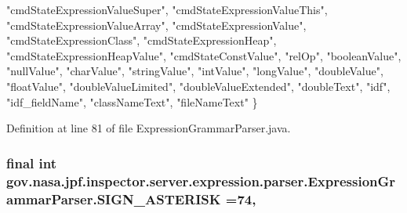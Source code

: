 \begin{DoxyCode}
    \textcolor{stringliteral}{"cmdStateExpressionValueSuper"}, \textcolor{stringliteral}{"cmdStateExpressionValueThis"}, \textcolor{stringliteral}{"cmdStateExpressionValueArray"}, 
    \textcolor{stringliteral}{"cmdStateExpressionValue"}, \textcolor{stringliteral}{"cmdStateExpressionClass"}, \textcolor{stringliteral}{"cmdStateExpressionHeap"}, 
    \textcolor{stringliteral}{"cmdStateExpressionHeapValue"}, \textcolor{stringliteral}{"cmdStateConstValue"}, \textcolor{stringliteral}{"relOp"}, \textcolor{stringliteral}{"booleanValue"}, 
    \textcolor{stringliteral}{"nullValue"}, \textcolor{stringliteral}{"charValue"}, \textcolor{stringliteral}{"stringValue"}, \textcolor{stringliteral}{"intValue"}, \textcolor{stringliteral}{"longValue"}, \textcolor{stringliteral}{"doubleValue"}, 
    \textcolor{stringliteral}{"floatValue"}, \textcolor{stringliteral}{"doubleValueLimited"}, \textcolor{stringliteral}{"doubleValueExtended"}, \textcolor{stringliteral}{"doubleText"}, 
    \textcolor{stringliteral}{"idf"}, \textcolor{stringliteral}{"idf\_fieldName"}, \textcolor{stringliteral}{"classNameText"}, \textcolor{stringliteral}{"fileNameText"}
  \}
\end{DoxyCode}


Definition at line 81 of file Expression\+Grammar\+Parser.\+java.

\subsubsection[{\texorpdfstring{S\+I\+G\+N\+\_\+\+A\+S\+T\+E\+R\+I\+SK}{SIGN_ASTERISK}}]{\setlength{\rightskip}{0pt plus 5cm}final int gov.\+nasa.\+jpf.\+inspector.\+server.\+expression.\+parser.\+Expression\+Grammar\+Parser.\+S\+I\+G\+N\+\_\+\+A\+S\+T\+E\+R\+I\+SK =74\hspace{0.3cm}{\ttfamily [static]}, {\ttfamily [package]}}\hypertarget{classgov_1_1nasa_1_1jpf_1_1inspector_1_1server_1_1expression_1_1parser_1_1_expression_grammar_parser_a32dffe840b4cc9423cc60e2fe0612b97}{}\label{classgov_1_1nasa_1_1jpf_1_1inspector_1_1server_1_1expression_1_1parser_1_1_expression_grammar_parser_a32dffe840b4cc9423cc60e2fe0612b97}


